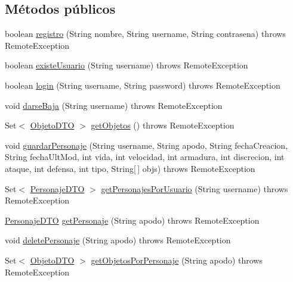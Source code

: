 \subsection*{Métodos públicos}
\begin{DoxyCompactItemize}
\item 
boolean \hyperlink{interfacees_1_1deusto_1_1spq_1_1_t_e_scc_1_1servidor_1_1_i_facade_ac638041330e66a5575c692620ff5e715}{registro} (String nombre, String username, String contrasena)  throws Remote\+Exception
\item 
boolean \hyperlink{interfacees_1_1deusto_1_1spq_1_1_t_e_scc_1_1servidor_1_1_i_facade_a0b9ec195d311f079b7f053f3ac0f9f22}{existe\+Usuario} (String username)  throws Remote\+Exception
\item 
boolean \hyperlink{interfacees_1_1deusto_1_1spq_1_1_t_e_scc_1_1servidor_1_1_i_facade_a723d08ea6337d51312fc217d70e0d8c0}{login} (String username, String password)  throws Remote\+Exception
\item 
void \hyperlink{interfacees_1_1deusto_1_1spq_1_1_t_e_scc_1_1servidor_1_1_i_facade_ad80d9e864a5e17a76c59aa30886f8e83}{darse\+Baja} (String username)  throws Remote\+Exception
\item 
Set$<$ \hyperlink{classes_1_1deusto_1_1spq_1_1_t_e_scc_1_1dto_1_1_objeto_d_t_o}{Objeto\+D\+T\+O} $>$ \hyperlink{interfacees_1_1deusto_1_1spq_1_1_t_e_scc_1_1servidor_1_1_i_facade_a0bddee11d54b874ccf495c953f3558dd}{get\+Objetos} ()  throws Remote\+Exception
\item 
void \hyperlink{interfacees_1_1deusto_1_1spq_1_1_t_e_scc_1_1servidor_1_1_i_facade_a6d86b34b1704cb69d2fccdcf658e3212}{guardar\+Personaje} (String username, String apodo, String fecha\+Creacion, String fecha\+Ult\+Mod, int vida, int velocidad, int armadura, int discrecion, int ataque, int defensa, int tipo, String\mbox{[}$\,$\mbox{]} objs)  throws Remote\+Exception
\item 
Set$<$ \hyperlink{classes_1_1deusto_1_1spq_1_1_t_e_scc_1_1dto_1_1_personaje_d_t_o}{Personaje\+D\+T\+O} $>$ \hyperlink{interfacees_1_1deusto_1_1spq_1_1_t_e_scc_1_1servidor_1_1_i_facade_abd919eb4e86d71f9e5ba783336418d20}{get\+Personajes\+Por\+Usuario} (String username)  throws Remote\+Exception
\item 
\hyperlink{classes_1_1deusto_1_1spq_1_1_t_e_scc_1_1dto_1_1_personaje_d_t_o}{Personaje\+D\+T\+O} \hyperlink{interfacees_1_1deusto_1_1spq_1_1_t_e_scc_1_1servidor_1_1_i_facade_af0dc2f7dcd891c7e0bae76899b60daf5}{get\+Personaje} (String apodo)  throws Remote\+Exception
\item 
void \hyperlink{interfacees_1_1deusto_1_1spq_1_1_t_e_scc_1_1servidor_1_1_i_facade_abe23790fcd25b3b1f23210f913b652d4}{delete\+Personaje} (String apodo)  throws Remote\+Exception
\item 
Set$<$ \hyperlink{classes_1_1deusto_1_1spq_1_1_t_e_scc_1_1dto_1_1_objeto_d_t_o}{Objeto\+D\+T\+O} $>$ \hyperlink{interfacees_1_1deusto_1_1spq_1_1_t_e_scc_1_1servidor_1_1_i_facade_af645550d86b3cd347024095efbbf4624}{get\+Objetos\+Por\+Personaje} (String apodo)  throws Remote\+Exception
\end{DoxyCompactItemize}


